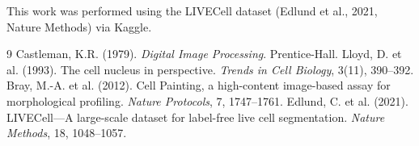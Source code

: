 \documentclass[11pt,a4paper]{article}
\begin{document}
This work was performed using the LIVECell dataset
(Edlund et al., 2021, Nature Methods) via Kaggle.

\begin{thebibliography}{9}
 Castleman, K.R. (1979). \textit{Digital Image
    Processing}. Prentice-Hall.
 Lloyd, D. et al. (1993). The cell nucleus in
    perspective. \textit{Trends in Cell Biology}, 3(11), 390--392.
 Bray, M.-A. et al. (2012). Cell Painting, a
    high-content image-based assay for morphological profiling.
    \textit{Nature Protocols}, 7, 1747--1761.
 Edlund, C. et al. (2021). LIVECell---A
    large-scale dataset for label-free live cell segmentation.
    \textit{Nature Methods}, 18, 1048--1057.
\end{thebibliography}
\end{document}
